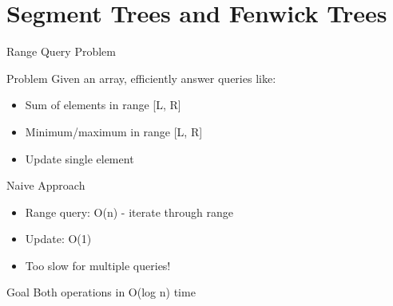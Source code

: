 \documentclass[aspectratio=169,xcolor=dvipsnames]{beamer}
\begin{document}
\section{Segment Trees and Fenwick Trees}

\begin{frame}{Range Query Problem}
  \begin{block}{Problem}
    Given an array, efficiently answer queries like:
    \begin{itemize}
      \item Sum of elements in range [L, R]
      \item Minimum/maximum in range [L, R]
      \item Update single element
    \end{itemize}
  \end{block}

  \begin{alertblock}{Naive Approach}
    \begin{itemize}
      \item Range query: O(n) - iterate through range
      \item Update: O(1)
      \item Too slow for multiple queries!
    \end{itemize}
  \end{alertblock}

  \begin{exampleblock}{Goal}
    Both operations in O(log n) time
  \end{exampleblock}
\end{frame}
\end{document}
